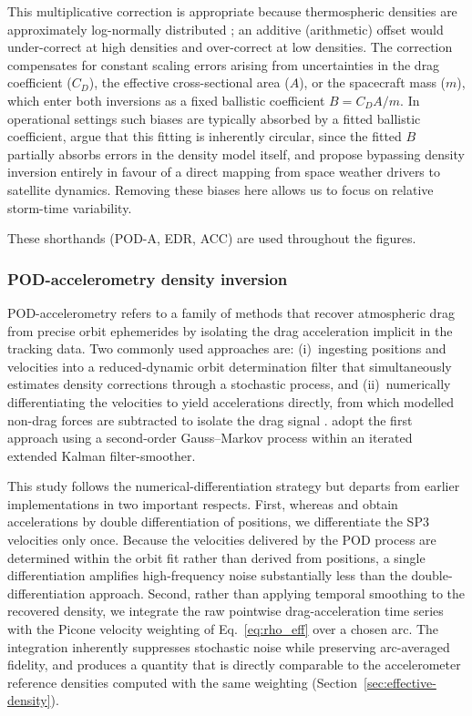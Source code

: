 \documentclass[draft]{agujournal2019}
\begin{document}
\noindent This multiplicative correction is appropriate because thermospheric
densities are approximately log-normally distributed
\cite{Emmert2015ThermosphericReview, Picone2005ThermosphericSets}; an additive
(arithmetic) offset would under-correct at high densities and over-correct at
low densities. The correction compensates for constant scaling errors arising
from uncertainties in the drag coefficient ($C_D$), the effective
cross-sectional area ($A$), or the spacecraft mass ($m$), which enter both
inversions as a fixed ballistic coefficient $B = C_D A / m$. In operational
settings such biases are typically absorbed by a fitted ballistic coefficient,
 argue that this fitting is inherently circular, since the fitted $B$ partially absorbs errors in the density model itself, and propose bypassing density inversion entirely in favour of a direct mapping from space weather drivers to satellite dynamics.
Removing these biases here allows us to focus on relative storm-time variability.

These shorthands (POD-A, EDR, ACC) are used throughout the figures.

\subsubsection{POD-accelerometry density inversion}
\label{sec:pod-density-inversion}

POD-accelerometry refers to a family of methods that recover atmospheric
drag from precise orbit ephemerides by isolating the drag acceleration
implicit in the tracking data. Two commonly used approaches are:
(i)~ingesting positions and velocities into a reduced-dynamic orbit
determination filter that simultaneously estimates density corrections
through a stochastic process, and (ii)~numerically differentiating the
velocities to yield accelerations directly, from which modelled non-drag
forces are subtracted to isolate the drag signal
\cite{Bezdek2010CalibrationAccelerations, Calabia2015ASignal,
Calabia2017ThermosphericOrbits}.  adopt
the first approach using a second-order Gauss--Markov process within an
iterated extended Kalman filter-smoother.

This study follows the numerical-differentiation strategy but departs from
earlier implementations in two important respects. First, whereas
 and 
obtain accelerations by double differentiation of positions, we differentiate
the SP3 velocities only once. Because the velocities delivered by the POD
process are determined within the orbit fit rather than derived from
positions, a single differentiation amplifies high-frequency noise
substantially less than the double-differentiation approach. Second, rather
than applying temporal smoothing to the recovered density, we integrate the
raw pointwise drag-acceleration time series with the Picone velocity weighting
of Eq.~\eqref{eq:rho_eff} over a chosen arc. The integration inherently
suppresses stochastic noise while preserving arc-averaged fidelity, and
produces a quantity that is directly comparable to the accelerometer reference
densities computed with the same weighting
(Section~\ref{sec:effective-density}).
\end{document}
